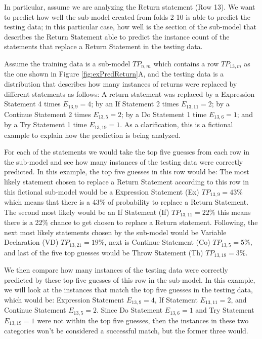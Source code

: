 \documentclass[conference]{IEEEtran}
\begin{document}
In 
particular, assume we are analyzing the Return statement (Row 13). We want to 
predict 
how well the sub-model created from folds 2-10 is able to predict the testing 
data; in this particular case, how well is the section of the sub-model that 
describes the Return Statement able to predict the instance count of the 
statements that replace a Return Statement in the testing data.

Assume the training data is a sub-model $TP_{n,m}$ which contains a row 
$TP_{13,m}$ as the one shown in Figure 
\ref{fig:exPredReturn}A, and the testing data is a distribution that describes 
how many instances of returns were replaced by different statements as follows: 
A return statement was replaced by a Expression Statement 4 times $E_{13,9} = 
4$; by an If 
Statement 2 times $E_{13,11} = 2$; by a Continue Statement 2 times $E_{13,5} = 
2$; by a Do Statement 1 time $E_{13,6} = 1$;
and by a Try Statement 1 time $E_{13,19} = 1$. As a clarification, this is a 
fictional example 
to explain how the prediction is being analyzed.

For each of the statements we would take the top five guesses from each row in 
the sub-model and see how many instances of the testing data were correctly 
predicted. In this example, the top five guesses in this row would be: The most 
likely statement chosen to replace a Return Statement according to this row in 
this fictional sub-model would be a Expression Statement (Ex) $TP_{13,9} = 43\%$ 
which means that there is a 43\% of probability to replace a Return Statement. 
The second most likely would be an If Statement (If) $TP_{13,11} = 22\%$ this 
means there is a 22\% chance to get chosen to replace a Return statement. 
Following, the next most likely statements chosen by the 
sub-model would be  Variable Declaration (VD)  $TP_{13,21} = 19\%$, next is 
Continue Statement (Co)  $TP_{13,5} = 5\%$, and last of the five top guesses 
would 
be Throw Statement (Th) $TP_{13,18} = 3\%$.

We then compare how many instances of the testing data were correctly predicted 
by these top five guesses of this row in the sub-model. In this example, we will 
look at the instances that match the top five guesses in the testing data, which 
would be: Expression Statement $E_{13,9} = 4$, If Statement $E_{13,11} = 2$, and 
Continue Statement $E_{13,5} = 2$. Since Do 
Statement $E_{13,6} = 1$ and Try Statement $E_{13,19} = 1$ were not within the 
top five guesses, then the 
instances in these two categories won't be considered a successful match, but 
the former three would. 
\end{document}
